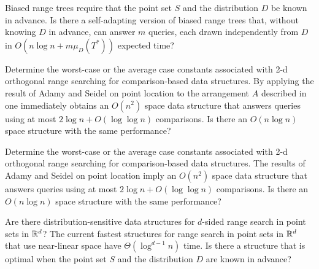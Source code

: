 \documentclass[lotsofwhite,charterfonts]{patmorin}
\begin{document}
\begin{op}
Biased range trees require that the point set $S$ and the
distribution $D$ be known in advance.  Is
there a self-adapting version of biased range trees that, without
knowing $D$ in advance, can answer $m$ queries, each drawn
independently from $D$ in $O(n\log n+ m\mu_D(T^*))$ expected time?
\end{op}

\begin{op}
Determine the worst-case or the average case constants associated with
2-d orthogonal range searching for comparison-based data structures.
By applying the result of Adamy and Seidel \cite{as98} on point
location to the arrangement $A$ described in  one
immediately obtains an $O(n^2)$ space data structure that answers
queries using at most $2\log n + O(\log\log n)$ comparisons.  Is there
an $O(n\log n)$ space structure with the same performance?
\end{op}

\begin{op}
Determine the worst-case or the average case constants associated with
2-d orthogonal range searching for comparison-based data structures.
The results of Adamy and Seidel \cite{as98} on point location  imply an
$O(n^2)$ space data structure that answers queries using at most
$2\log n + O(\log\log n)$ comparisons.  Is there an $O(n\log n)$ space
structure with the same performance?
\end{op}

\begin{op}
Are there distribution-sensitive data structures for $d$-sided range
search in point sets in $\mathbb{R}^d$?  The current fastest structures
for range search in point sets in $\mathbb{R}^d$ that use near-linear space have
$\Theta(\log^{d-1} n)$ time.  Is there a structure that is optimal
when the point set $S$ and the distribution $D$ are known in advance?
\end{op}




\end{document}
